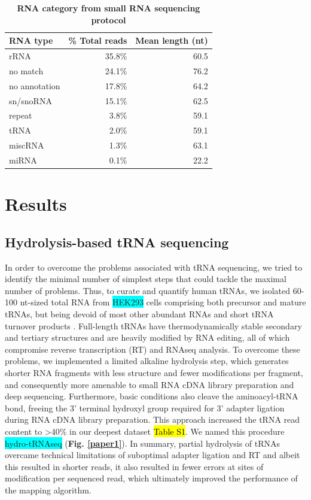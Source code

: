 \documentclass[12pt]{rockefeller}
\newcommand{\cyan}[1]{\colorbox{cyan}{#1}}
\begin{document}
\begin{table}[!ht]
\begin{center}
\tabulinesep=1.2mm
\begin{tabu}{ | l | r | r |}
	\hline
    RNA type & \% Total reads & Mean length (nt) \\ \hline
	rRNA & 35.8\% & 60.5 \\ \hline
	no match  & 24.1\% & 76.2 \\ \hline
	no annotation & 17.8\% & 64.2 \\ \hline
	sn/snoRNA & 15.1\% & 62.5 \\ \hline
	repeat & 3.8\% & 59.1 \\ \hline
	tRNA & 2.0\% & 59.1 \\ \hline
	miscRNA & 1.3\% & 63.1 \\ \hline
	miRNA & 0.1\% & 22.2 \\
	\hline
\end{tabu}
\end{center}
\caption[RNA category from small RNA sequencing protocol]{\textbf{RNA category from small RNA sequencing protocol}}\label{abysmal}
\end{table}

\chapter{Results}

\section{Hydrolysis-based tRNA sequencing}
In order to overcome the problems associated with tRNA sequencing, we tried to identify the minimal number of simplest steps that could tackle the maximal number of problems. Thus, to curate and quantify human tRNAs, we isolated 60-100 nt-sized total RNA from \cyan{HEK293} cells comprising both precursor and mature tRNAs, but being devoid of most other abundant RNAs and short tRNA turnover products \cite{Lee:2009fb}. Full-length tRNAs have thermodynamically stable secondary and tertiary structures and are heavily modified by RNA editing, all of which compromise reverse transcription (RT) and RNAseq analysis. To overcome these problems, we implemented a limited alkaline hydrolysis step, which generates shorter RNA fragments with less structure and fewer modifications per fragment, and consequently more amenable to small RNA cDNA library preparation and deep sequencing. Furthermore, basic conditions also cleave the aminoacyl-tRNA bond, freeing the 3’ terminal hydroxyl group required for 3’ adapter ligation during RNA cDNA library preparation. This approach increased the tRNA read content to >40\% in our deepest dataset \hl{Table S1}. We named this procedure \cyan{hydro-tRNAseq} (\textbf{Fig. \ref{paper1}}).  In summary, partial hydrolysis of tRNAs overcame technical limitations of suboptimal adapter ligation and RT and albeit this resulted in shorter reads, it also resulted in fewer errors at sites of modification per sequenced read, which ultimately improved the performance of the mapping algorithm.
\end{document}
